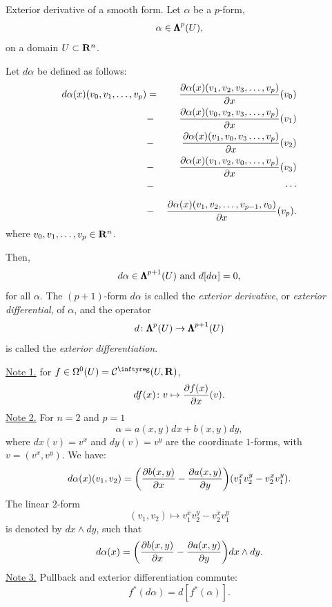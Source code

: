 \begin{Article}{Exterior derivative of a smooth form.}{}
  \label{Exterior-derivative-of-a-smooth-form}
  Let $\alpha$ be a $p$-form,
  $$%
    \alpha \in \SmoothForms^p(U),
  $$%
  on a domain $U \subset \mathbf{R}^n$.

  Let $d\alpha$ be defined as follows:
  \allowdisplaybreaks
  \begin{eqnarray*}
    d\alpha(x)(v_0,v_1,\dots,v_p) & = & {\partial \alpha(x)(v_1,v_2,v_3,\dots,v_p) \over \partial x}(v_0) \\
    & - & {\partial \alpha(x)(v_0,v_2,v_3,\dots,v_p) \over \partial x}(v_1) \\
    & - & {\partial \alpha(x)(v_1,v_0,v_3\dots,v_p) \over \partial x}(v_2) \\
    & - & {\partial \alpha(x)(v_1,v_2,v_0,\dots,v_p) \over \partial x}(v_3) \\
    & - & \cdots \\[1ex]
    & - & {\partial \alpha(x)(v_1,v_2,\dots,v_{p-1},v_0) \over \partial x}(v_p).
  \end{eqnarray*}
  where $v_0,v_1,\dots,v_p \in \mathbf{R}^n$.

  Then,
  $$%
    d\alpha \in \SmoothForms^{p+1}(U)
    \SpacedText{and}
    d[d\alpha] = 0,
  $$%
  for all $\alpha$.
  The $(p+1)$-form $d\alpha$ is called the \emph{exterior derivative},
  or \emph{exterior differential},
  of $\alpha$,
  and the operator
  $$%
    d \colon \SmoothForms^p(U) \to \SmoothForms^{p+1}(U)
  $$%
  is called the \emph{exterior differentiation}.

  \uline{Note 1.} for $f \in \DForms^0(U) = \Cinfty(U,\RR)$,
  $$%
    df(x) \colon v \mapsto {\partial f(x) \over \partial x}(v).
  $$%
  \uline{Note 2.} For $n = 2$ and $p=1$
  $$%
    \alpha = a(x,y) dx + b(x,y) dy,
  $$%
  where $dx(v) = v^x$ and $dy(v) = v^y$ are the coordinate $1$-forms,
  with $v= (v^x,v^y)$.
  We have:
  $$%
    d\alpha(x)(v_1,v_2) = \bigg({\partial b(x,y) \over \partial x} - {\partial a(x,y) \over \partial y} \bigg) (v_1^x v_2^y - v_2^x v_1^y).
  $$%
  The linear $2$-form
  $$%
    (v_1,v_2) \mapsto v_1^x v_2^y - v_2^x v_1^y
  $$%
  is denoted by $dx \wedge dy$,
  such that
  $$%
    d\alpha(x) = \bigg({\partial b(x,y) \over \partial x} - {\partial a(x,y) \over \partial y}\bigg) dx \wedge dy.
  $$%
  \uline{Note 3.} Pullback and exterior differentiation commute:
  $$%
    f^*(d\alpha) = d[f^*(\alpha)].
  $$%
\end{Article}

